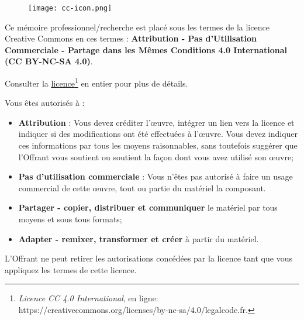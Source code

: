         \begin{figure}[H]
            \centering
            \texttt{[image: cc-icon.png]}
            \label{traitement}
        \end{figure}

    Ce mémoire professionnel/recherche est placé sous les termes de la licence Creative Commons en ces termes : \textbf{Attribution - Pas d'Utilisation Commerciale - Partage dans les Mêmes Conditions 4.0 International (CC BY-NC-SA 4.0)}.
\bigskip

    Consulter la \href{https://creativecommons.org/licenses/by-nc-sa/4.0/legalcode.fr}{licence\footnote{
\textit{Licence CC 4.0 International}, en ligne: \url{https://creativecommons.org/licenses/by-nc-sa/4.0/legalcode.fr}.}} en entier pour plus de détails. 
\bigskip

    Vous êtes autorisés à :
    \begin{itemize}
        \item \textbf{Attribution} : Vous devez créditer l'\oe uvre, intégrer un lien vers la licence et indiquer si des modifications ont été effectuées à l'\oe uvre. Vous devez indiquer ces informations par tous les moyens raisonnables, sans toutefois suggérer que l'Offrant vous soutient ou soutient la façon dont vous avez utilisé son \oe uvre;
        \item \textbf{Pas d'utilisation commerciale} : Vous n'êtes pas autorisé à faire un usage commercial de cette \oe uvre, tout ou partie du matériel la composant. 
        \item \textbf{Partager - copier, distribuer et communiquer} le matériel par tous moyens et sous tous formats;
        \item \textbf{Adapter - remixer, transformer et créer} à partir du matériel.
    \end{itemize}
\bigskip

L'Offrant ne peut retirer les autorisations concédées par la licence tant que vous appliquez les termes de cette licence.

\newpage
\thispagestyle{empty}
